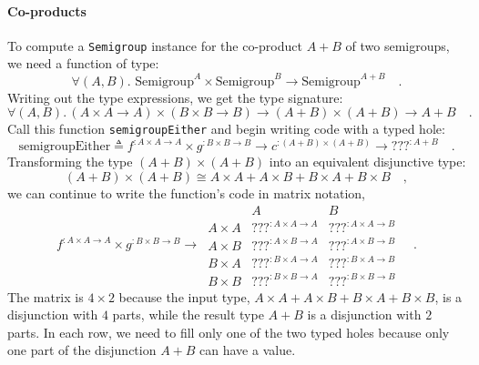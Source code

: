\paragraph{Co-products}

To compute a \lstinline!Semigroup! instance for the co-product $A+B$
of two semigroups, we need a function of type:
\[
\forall(A,B).\,\,\text{Semigroup}^{A}\times\text{Semigroup}^{B}\rightarrow\text{Semigroup}^{A+B}\quad.
\]
Writing out the type expressions, we get the type signature:
\[
\forall(A,B).\,\left(A\times A\rightarrow A\right)\times\left(B\times B\rightarrow B\right)\rightarrow\left(A+B\right)\times\left(A+B\right)\rightarrow A+B\quad.
\]
Call this function \lstinline!semigroupEither! and begin writing
code with a typed hole:
\[
\text{semigroupEither}\triangleq f^{:A\times A\rightarrow A}\times g^{:B\times B\rightarrow B}\rightarrow c^{:\left(A+B\right)\times\left(A+B\right)}\rightarrow\text{???}^{:A+B}\quad.
\]
Transforming the type $\left(A+B\right)\times\left(A+B\right)$ into
an equivalent disjunctive type:
\[
\left(A+B\right)\times\left(A+B\right)\cong A\times A+A\times B+B\times A+B\times B\quad,
\]
we can continue to write the function\textsf{'}s code in matrix notation,
\[
f^{:A\times A\rightarrow A}\times g^{:B\times B\rightarrow B}\rightarrow\,\begin{array}{|c||cc|}
 & A & B\\
\hline A\times A & \text{???}^{:A\times A\rightarrow A} & \text{???}^{:A\times A\rightarrow B}\\
A\times B & \text{???}^{:A\times B\rightarrow A} & \text{???}^{:A\times B\rightarrow B}\\
B\times A & \text{???}^{:B\times A\rightarrow A} & \text{???}^{:B\times A\rightarrow B}\\
B\times B & \text{???}^{:B\times B\rightarrow A} & \text{???}^{:B\times B\rightarrow B}
\end{array}\quad.
\]
The matrix is $4\times2$ because the input type, $A\times A+A\times B+B\times A+B\times B$,
is a disjunction with $4$ parts, while the result type $A+B$ is
a disjunction with $2$ parts. In each row, we need to fill only one
of the two typed holes because only one part of the disjunction $A+B$
can have a value.

